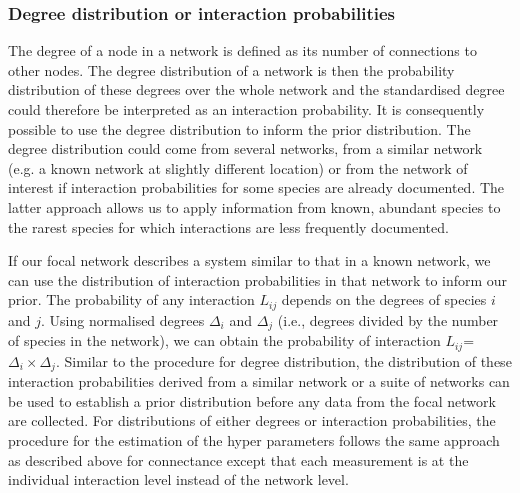 \documentclass[12pt]{article}
\begin{document}
\begin{spacing}{2.0}


      \subsubsection*{Degree distribution or interaction probabilities}

          The degree of a node in a network is defined as its number of connections to other nodes. The degree distribution of a network is then the probability distribution of these degrees over the whole network and the standardised degree could therefore be interpreted as an interaction probability. It is consequently possible to use the degree distribution to inform the prior distribution. The degree distribution could come from several networks, from a similar network (e.g. a known network at slightly different location) or from the network of interest if interaction probabilities for some species are already documented. The latter approach allows us to apply information from known, abundant species to the rarest species for which interactions are less frequently documented. 


          If our focal network describes a system similar to that in a known network, we can use the distribution of interaction probabilities in that network to inform our prior. The probability of any interaction $L_{ij}$ depends on the degrees of species $i$ and $j$. Using normalised degrees $\Delta_i$ and $\Delta_j$ (i.e., degrees divided by the number of species in the network), we can obtain the probability of interaction $L_{ij}$=$\Delta_i\times\Delta_j$. Similar to the procedure for degree distribution, the distribution of these interaction probabilities derived from a similar network or a suite of networks can be used to establish a prior distribution before any data from the focal network are collected. For distributions of either degrees or interaction probabilities, the procedure for the estimation of the hyper parameters follows the same approach as described above for connectance except that each measurement is at the individual interaction level instead of the network level.



\end{spacing}
\end{document}
